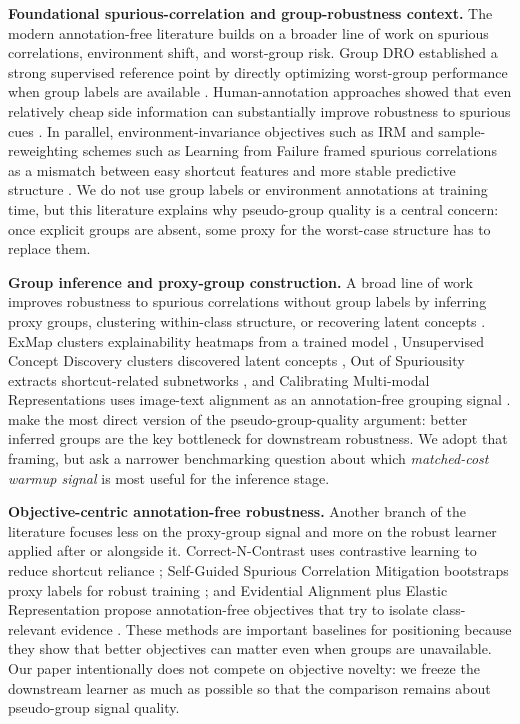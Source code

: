 \documentclass{article}
\begin{document}
\textbf{Foundational spurious-correlation and group-robustness context.}
The modern annotation-free literature builds on a broader line of work on spurious correlations, environment shift, and worst-group risk. Group DRO established a strong supervised reference point by directly optimizing worst-group performance when group labels are available \citep{sagawa2020groupdro}. Human-annotation approaches showed that even relatively cheap side information can substantially improve robustness to spurious cues \citep{srivastava2020human}. In parallel, environment-invariance objectives such as IRM and sample-reweighting schemes such as Learning from Failure framed spurious correlations as a mismatch between easy shortcut features and more stable predictive structure \citep{arjovsky2019irm,nam2020lff}. We do not use group labels or environment annotations at training time, but this literature explains why pseudo-group quality is a central concern: once explicit groups are absent, some proxy for the worst-case structure has to replace them.

\textbf{Group inference and proxy-group construction.}
A broad line of work improves robustness to spurious correlations without group labels by inferring proxy groups, clustering within-class structure, or recovering latent concepts \citep{han2024improving,chakraborty2024exmap,arefin2024unsupervisedconcept,le2024out,you2024calibrating}. ExMap clusters explainability heatmaps from a trained model \citep{chakraborty2024exmap}, Unsupervised Concept Discovery clusters discovered latent concepts \citep{arefin2024unsupervisedconcept}, Out of Spuriousity extracts shortcut-related subnetworks \citep{le2024out}, and Calibrating Multi-modal Representations uses image-text alignment as an annotation-free grouping signal \citep{you2024calibrating}. \citet{han2024improving} make the most direct version of the pseudo-group-quality argument: better inferred groups are the key bottleneck for downstream robustness. We adopt that framing, but ask a narrower benchmarking question about which \emph{matched-cost warmup signal} is most useful for the inference stage.

\textbf{Objective-centric annotation-free robustness.}
Another branch of the literature focuses less on the proxy-group signal and more on the robust learner applied after or alongside it. Correct-N-Contrast uses contrastive learning to reduce shortcut reliance \citep{zhang2022correctncontrast}; Self-Guided Spurious Correlation Mitigation bootstraps proxy labels for robust training \citep{zheng2024selfguided}; and Evidential Alignment plus Elastic Representation propose annotation-free objectives that try to isolate class-relevant evidence \citep{ye2025improving,wen2025elastic}. These methods are important baselines for positioning because they show that better objectives can matter even when groups are unavailable. Our paper intentionally does not compete on objective novelty: we freeze the downstream learner as much as possible so that the comparison remains about pseudo-group signal quality.
\end{document}
